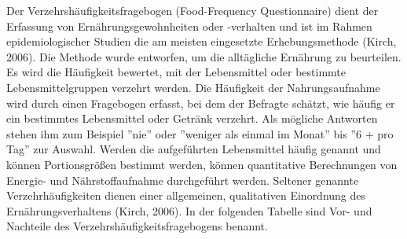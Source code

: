 Der Verzehrshäufigkeitsfragebogen (Food-Frequency Questionnaire) dient der Erfassung von Ernährungsgewohnheiten oder -verhalten und ist im Rahmen epidemiologischer Studien die am meisten eingesetzte Erhebungsmethode (Kirch, 2006). 
Die Methode wurde entworfen, um die alltägliche Ernährung zu beurteilen. Es wird die Häufigkeit bewertet, mit der Lebensmittel oder bestimmte Lebensmittelgruppen verzehrt werden. Die Häufigkeit der Nahrungsaufnahme wird durch einen Fragebogen erfasst, bei dem der Befragte schätzt, wie häufig er ein bestimmtes Lebensmittel oder Getränk verzehrt. Als mögliche Antworten stehen ihm zum Beispiel ''nie'' oder ''weniger als einmal im Monat'' bis ''6 + pro Tag'' zur Auswahl. Werden die aufgeführten Lebensmittel häufig genannt und können Portionsgrößen bestimmt werden, können quantitative Berechnungen von Energie- und Nährstoffaufnahme durchgeführt werden. Seltener genannte Verzehrhäufigkeiten dienen einer allgemeinen, qualitativen Einordnung des Ernährungsverhaltens (Kirch, 2006). 
In der folgenden Tabelle sind Vor- und Nachteile des Verzehrshäufigkeitsfragebogens benannt.






